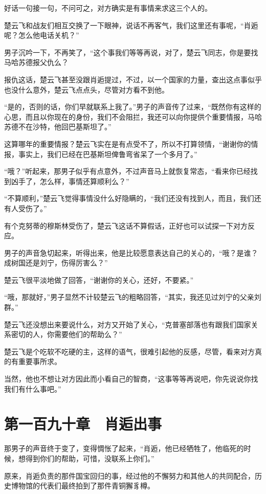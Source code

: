 好话一句接一句，不问可之，对方确实是有事情来求这三个人的。

楚云飞和战友们相互交换了一下眼神，说话不再客气，我们这里还有事呢，“肖逅呢？怎么他电话关机？”

男子沉吟一下，不再笑了，“这个事我们等等再说，对了，楚云飞同志，你是要找马哈苏德报父仇么？

报仇这话，楚云飞甚至没跟肖逅提过，不过，以一个国家的力量，查出这点事似乎也没什么意外，楚云飞点点头，尽管对方看不到他。

“是的，否则的话，你们早就联系上我了。”男子的声音传了过来，“既然你有这样的心思，而且以你现在的身份，我们不会阻拦，我还可以向你提供个重要情报，马哈苏德不在沙特，他回巴基斯坦了。”

这算哪年的重要情报？楚云飞实在是有点受不了，所以不打算领情，“谢谢你的情报，事实上，我们已经在巴基斯坦俾鲁弯省呆了一个多月了。”

“哦？”听起来，那男子似乎有点意外，不过声音马上就恢复常态，“看来你已经找到凶手了，怎么样，事情还算顺利么？”

“不算顺利，”楚云飞觉得事情没什么好隐瞒的，“我们还没有找到人，而且，我们还有人受伤了。”

有个克努蒂的穆斯林受伤了，楚云飞这话不算假话，正好也可以试探一下对方反应。

男子的声音急切起来，听得出来，他是比较愿意表达自己的关心的，“哦？是谁？成树国还是刘宁，伤得厉害么？”

楚云飞很平淡地做了回答，“谢谢你的关心，还好，不要紧。”

“哦，那就好，”男子显然不计较楚云飞的粗略回答，“其实，我还见过刘宁的父亲刘群。”

楚云飞还没想出来要说什么，对方又开始了关心，“克普塞部落也有跟我们国家关系密切的人，你需要他们的帮助么？”

楚云飞是个吃软不吃硬的主，这样的语气，很难引起他的反感，尽管，看来对方真的有重要事所求。

当然，他也不想让对方因此而小看自己的智商，“这事等等再说吧，你先说说你找我们有什么事吧。”

\section{第一百九十章　肖逅出事}

那男子的声音终于变了，变得惆怅了起来，“肖逅，他已经牺牲了，他临死的时候，想得到你们的帮助，可惜，没联系上你们。”

原来，肖逅负责的那件国宝回归的事，经过他的不懈努力和其他人的共同配合，历史博物馆的代表们最终拍到了那件青铜獬豸樽。

